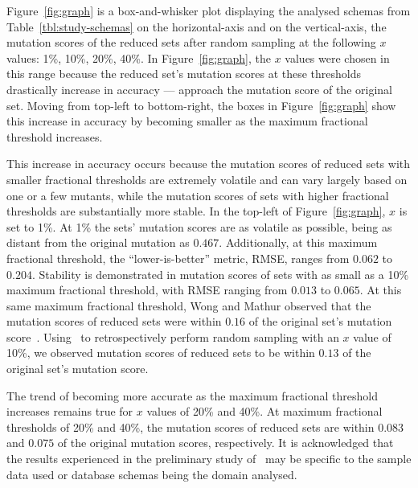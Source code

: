 

Figure~\ref{fig:graph} is a box-and-whisker plot displaying the analysed schemas from Table~\ref{tbl:study-schemas} on the horizontal-axis
and on the vertical-axis, the mutation scores of the reduced sets after random sampling at the following $x$ values: 1\%, 10\%, 20\%, 40\%.
In Figure~\ref{fig:graph}, the $x$ values were chosen in this range because the reduced set's mutation scores at these thresholds
drastically increase in accuracy --- approach the mutation score of the original set. Moving from top-left to bottom-right, the boxes in
Figure~\ref{fig:graph} show this increase in accuracy by becoming smaller as the maximum fractional threshold increases.

This increase in accuracy occurs because the mutation scores of reduced sets with smaller fractional thresholds are extremely volatile
and can vary largely based on one or a few mutants, while the mutation scores of sets with higher fractional thresholds are substantially
more stable. In the top-left of Figure~\ref{fig:graph}, $x$ is set to 1\%. At 1\% the sets' mutation scores are as volatile as possible,
being as distant from the original mutation as $0.467$. Additionally, at this maximum fractional threshold, the ``lower-is-better'' metric,
RMSE, ranges from $0.062$ to $0.204$. Stability is demonstrated in mutation scores of sets with as small as a 10\% maximum fractional
threshold, with RMSE ranging from $0.013$ to $0.065$. At this same maximum fractional threshold, Wong and Mathur observed that the mutation
scores of reduced sets were within $0.16$ of the original set's mutation score~\cite{mathur1994empirical, wong1993mutation}. Using \mr~to
retrospectively perform random sampling with an $x$ value of 10\%, we observed mutation scores of reduced sets to be within $0.13$ of the
original set's mutation score.

The trend of becoming more accurate as the maximum fractional threshold increases remains true for $x$ values of 20\% and 40\%. At maximum
fractional thresholds of 20\% and 40\%, the mutation scores of reduced sets are within $0.083$ and $0.075$ of the original mutation scores,
respectively. It is acknowledged that the results experienced in the preliminary study of \mr~may be specific to the sample data used or
database schemas being the domain analysed.
